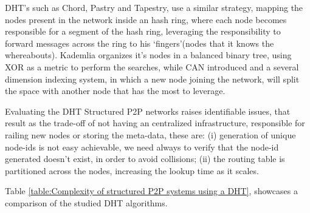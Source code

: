 DHT's such as Chord\cite{Stoica2001}, Pastry\cite{Rowstron2001} and Tapestry\cite{Zhao2001}, use a similar strategy, mapping the nodes present in the network inside an hash ring, where each node becomes responsible for a segment of the hash ring, leveraging the responsibility to forward messages across the ring to his `fingers'(nodes that it knows the whereabouts). Kademlia\cite{Maymounkov} organizes it's nodes in a balanced binary tree, using XOR as a metric to perform the searches, while CAN\cite{Handley} introduced and a several dimension indexing system, in which a new node joining the network, will split the space with another node that has the most to leverage.

Evaluating the DHT Structured P2P networks raises identifiable issues, that result as the trade-off of not having an centralized infrastructure, responsible for railing new nodes or storing the meta-data, these are: (i) generation of unique node-ids is not easy achievable, we need always to verify that the node-id generated doesn't exist, in order to avoid collisions; (ii) the routing table is partitioned across the nodes, increasing the lookup time as it scales.

Table \ref{table:Complexity of structured P2P systems using a DHT}, showcases a comparison of the studied DHT algorithms.

